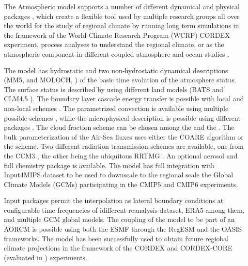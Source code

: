 \documentclass[journal abbreviation, manuscript]{copernicus}
\begin{document}
The Atmospheric model supports a number of different dynamical and physical
packages \citep{giorgi-2023}, which create a flexible tool used by multiple
research groups all over the world for the study of regional climate by
running long term simulations in the framework of the World Climate
Research Program (WCRP) CORDEX experiment, process analyses to understand
the regional climate, or as the atmospheric component in different
coupled atmosphere and ocean studies
\citep{perrie-2001,ufuk-gmd-2013,wei-2014,ratnam-2009,sitz-2017,
       disante-2019,reale-2020,mishra-2021}.

The model has hydrostatic \citep{anthes-1987} and two non-hydrostatic dynamical
descriptions (MM5, \citet{grell-1994} and MOLOCH, \citet{davolio-2020}) of
the basic time evolution of the atmosphere status. The surface status is
described by using different land models (BATS \citet{dickinson-1993}
and CLM4.5 \citet{oleson-2013}).
The boundary layer cascade energy transfer is possible with local and
non-local schemes \citep{holtslag-1989,park-2009}.
The parametrized convection is available using multiple possible schemes
\citep{emanuel-1991,tiedtke-1989,kain-2004}, while the microphysical
description is possible using different packages
\citep{pal-2000,lim-2005,noto-gmd-2016}.
The cloud fraction scheme can be chosen among the \citet{sundqvist-1989}
and the \citet{xu-1996}.
The bulk parameterization of the Air-Sea fluxes uses either the COARE
\citep{fairall-2003} algorithm or the \citet{zeng-2005} scheme.
Two different radiation transmission schemes are available, one from the
CCM3 \citep{kiehl-1996}, the other being the ubiquitous RRTMG
\citep{mlawer-1997,iacono-2008}.
An optional aerosol \citep{zakey-2006,zakey-2008,solmon-2008} and
full chemistry package \citep{shalaby-2012} is available.
The model has full integration with Input4MIPS \citep{durack-2017}
dataset to be used to downscale to the regional scale the Global
Climate Models (GCMs) participating in the CMIP5 \citep{taylor-2012}
and CMIP6 \citep{eyring-2016} experiments.

Input packages permit the interpolation as lateral boundary conditions
at configurable time frequencies of idifferent reanalysis dataset, ERA5
\citep{hershbach-2020} among them, and multiple GCM global models.
The coupling of the model to be part of an AORCM is possible using both
the ESMF through the RegESM and the OASIS \citep{craig-2017} frameworks.
The model has been successfully used to obtain future regiobal climate
projections in the framework of the CORDEX \citep{gutowski-2016}
and CORDEX-CORE (evaluated in \citet{remedio-2019}) experiments.
\end{document}
